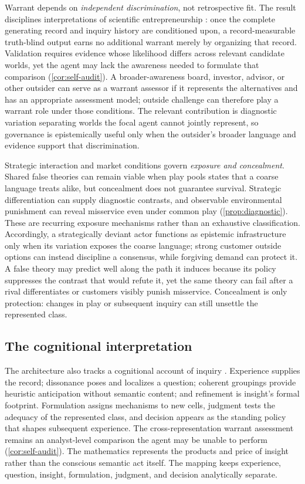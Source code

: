 \documentclass[11pt]{article}
\theoremstyle{definition}
\begin{document}
Warrant depends on \emph{independent discrimination}, not retrospective fit.
The result disciplines interpretations of scientific entrepreneurship \citep{CamuffoEtAl2020,ZellwegerZenger2023}: once the complete generating record and inquiry history are conditioned upon, a record-measurable truth-blind output earns no additional warrant merely by organizing that record.
Validation requires evidence whose likelihood differs across relevant candidate worlds, yet the agent may lack the awareness needed to formulate that comparison (\cref{cor:self-audit}).
A broader-awareness board, investor, advisor, or other outsider can serve as a warrant assessor if it represents the alternatives and has an appropriate assessment model; outside challenge can therefore play a warrant role under those conditions.
The relevant contribution is diagnostic variation separating worlds the focal agent cannot jointly represent, so governance is epistemically useful only when the outsider's broader language and evidence support that discrimination.

Strategic interaction and market conditions govern \emph{exposure and concealment}.
Shared false theories can remain viable when play pools states that a coarse language treats alike, but concealment does not guarantee survival.
Strategic differentiation can supply diagnostic contrasts, and observable environmental punishment can reveal misservice even under common play (\cref{prop:diagnostic}).
These are recurring exposure mechanisms rather than an exhaustive classification.
Accordingly, a strategically deviant actor functions as epistemic infrastructure only when its variation exposes the coarse language; strong customer outside options can instead discipline a consensus, while forgiving demand can protect it.
A false theory may predict well along the path it induces because its policy suppresses the contrast that would refute it, yet the same theory can fail after a rival differentiates or customers visibly punish misservice.
Concealment is only protection: changes in play or subsequent inquiry can still unsettle the represented class.

\subsection{The cognitional interpretation}

The architecture also tracks a cognitional account of inquiry \citep{Lonergan1992,RyallWilkins2018}.
Experience supplies the record; dissonance poses and localizes a question; coherent groupings provide heuristic anticipation without semantic content; and refinement is insight's formal footprint.
Formulation assigns mechanisms to new cells, judgment tests the adequacy of the represented class, and decision appears as the standing policy that shapes subsequent experience.
The cross-representation warrant assessment remains an analyst-level comparison the agent may be unable to perform (\cref{cor:self-audit}).
The mathematics represents the products and price of insight rather than the conscious semantic act itself.
The mapping keeps experience, question, insight, formulation, judgment, and decision analytically separate.
\end{document}
